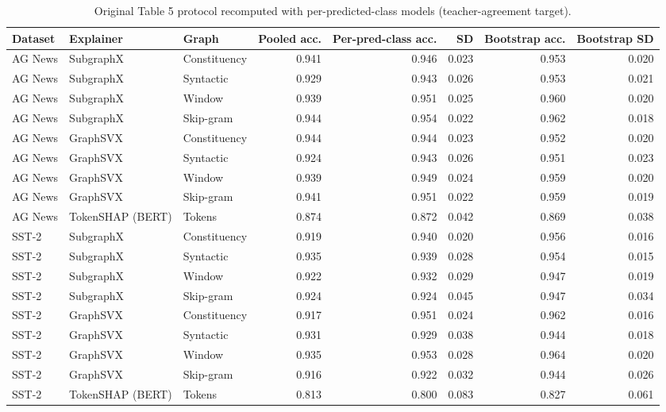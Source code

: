 \begin{table}[H]
\centering
\small
\caption{Original Table 5 protocol recomputed with per-predicted-class models (teacher-agreement target).}
\label{tab:lr_paper_protocol}
\begin{tabular}{lllrrrrr}
\toprule
Dataset & Explainer & Graph & Pooled acc. & Per-pred-class acc. & SD & Bootstrap acc. & Bootstrap SD \\
\midrule
AG News & SubgraphX & Constituency & 0.941 & 0.946 & 0.023 & 0.953 & 0.020 \\
AG News & SubgraphX & Syntactic & 0.929 & 0.943 & 0.026 & 0.953 & 0.021 \\
AG News & SubgraphX & Window & 0.939 & 0.951 & 0.025 & 0.960 & 0.020 \\
AG News & SubgraphX & Skip-gram & 0.944 & 0.954 & 0.022 & 0.962 & 0.018 \\
AG News & GraphSVX & Constituency & 0.944 & 0.944 & 0.023 & 0.952 & 0.020 \\
AG News & GraphSVX & Syntactic & 0.924 & 0.943 & 0.026 & 0.951 & 0.023 \\
AG News & GraphSVX & Window & 0.939 & 0.949 & 0.024 & 0.959 & 0.020 \\
AG News & GraphSVX & Skip-gram & 0.941 & 0.951 & 0.022 & 0.959 & 0.019 \\
AG News & TokenSHAP (BERT) & Tokens & 0.874 & 0.872 & 0.042 & 0.869 & 0.038 \\
SST-2 & SubgraphX & Constituency & 0.919 & 0.940 & 0.020 & 0.956 & 0.016 \\
SST-2 & SubgraphX & Syntactic & 0.935 & 0.939 & 0.028 & 0.954 & 0.015 \\
SST-2 & SubgraphX & Window & 0.922 & 0.932 & 0.029 & 0.947 & 0.019 \\
SST-2 & SubgraphX & Skip-gram & 0.924 & 0.924 & 0.045 & 0.947 & 0.034 \\
SST-2 & GraphSVX & Constituency & 0.917 & 0.951 & 0.024 & 0.962 & 0.016 \\
SST-2 & GraphSVX & Syntactic & 0.931 & 0.929 & 0.038 & 0.944 & 0.018 \\
SST-2 & GraphSVX & Window & 0.935 & 0.953 & 0.028 & 0.964 & 0.020 \\
SST-2 & GraphSVX & Skip-gram & 0.916 & 0.922 & 0.032 & 0.944 & 0.026 \\
SST-2 & TokenSHAP (BERT) & Tokens & 0.813 & 0.800 & 0.083 & 0.827 & 0.061 \\
\bottomrule
\end{tabular}
\end{table}

